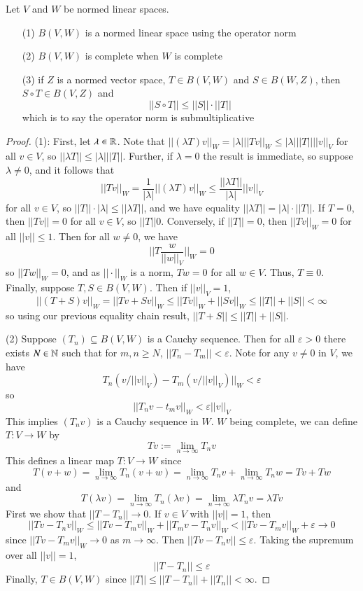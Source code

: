 \begin{proposition}
    Let $V$ and $W$ be normed linear spaces. \begin{itemize}
        \item[(1)] $B(V,W)$ is a normed linear space using the operator norm
        \item[(2)] $B(V,W)$ is complete when $W$ is complete
        \item[(3)] if $Z$ is a normed vector space, $T \in B(V,W)$ and $S \in B(W,Z)$, then $S\circ T \in B(V,Z)$ and $$||S\circ T|| \leq ||S||\cdot||T||$$
            which is to say the operator norm is submultiplicative
    \end{itemize}
\end{proposition}
\begin{proof}
    (1): First, let $\lambda \in \mathbb R$. Note that $||(\lambda T)v||_W = |\lambda|||Tv||_W \leq |\lambda|||T||||v||_V$ for all $v \in V$, so $||\lambda T|| \leq |\lambda|||T||$. Further, if $\lambda = 0$ the result is immediate, so suppose $\lambda \neq 0$, and it follows that $$||Tv||_W = \frac{1}{|\lambda|}||(\lambda T)v||_W \leq \frac{||\lambda T||}{|\lambda|}||v||_V$$ for all $v \in V$, so $|| T||\cdot|\lambda| \leq ||\lambda T||$, and we have equality $||\lambda T|| = |\lambda|\cdot||T||$. If $T = 0$, then $||Tv|| = 0$ for all $v \in V$, so $||T|| 0$. Conversely, if $||T|| = 0$, then $||Tv||_W = 0$ for all $||v|| \leq 1$. Then for all $w \neq 0$, we have $$||T\frac{w}{||w||_V}||_W = 0$$ so $||Tw||_W = 0$, and as $||\cdot||_W$ is a norm, $Tw = 0$ for all $w \in V$. Thus, $T \equiv 0$. Finally, suppose $T,S \in B(V,W)$. Then if $||v||_V = 1$, $$||(T+S)v||_W = ||Tv+Sv||_W \leq ||Tv||_W+||Sv||_W \leq ||T|| + ||S|| < \infty$$ so using our previous equality chain result, $||T+S|| \leq ||T|| + ||S||$.

    (2) Suppose $(T_n) \subseteq B(V,W)$ is a Cauchy sequence. Then for all $\varepsilon > 0$ there exists $N \in \mathbb N$ such that for $m,n \geq N$, $||T_n - T_m || < \varepsilon$. Note for any $v\neq 0$ in $V$, we have $$T_n(v/||v||_V) - T_m(v/||v||_V)||_W < \varepsilon$$ so $$||T_nv - t_mv||_W <\varepsilon||v||_V$$ This implies $(T_nv)$ is a Cauchy sequence in $W$. $W$ being complete, we can define $T:V\rightarrow W$ by $$Tv:= \lim\limits_{n\rightarrow \infty}T_nv$$ This defines a linear map $T:V\rightarrow W$ since $$T(v+w) = \lim\limits_{n\rightarrow\infty}T_n(v+w) = \lim\limits_{n\rightarrow \infty}T_nv + \lim\limits_{n\rightarrow \infty}T_nw = Tv + Tw$$ and $$T(\lambda v) = \lim\limits_{n\rightarrow \infty}T_n(\lambda v) = \lim\limits_{n\rightarrow \infty}\lambda T_nv = \lambda Tv$$ First we show that $||T-T_n||\rightarrow 0$. If $v \in V$ with $||v|| = 1$, then $$||Tv - T_nv||_W \leq ||Tv - T_mv||_W + ||T_mv-T_nv||_W < ||Tv - T_mv||_W+\varepsilon\rightarrow 0$$ since $||Tv-T_mv||_W\rightarrow 0$ as $m\rightarrow \infty$. Then $||Tv-T_nv|| \leq \varepsilon$. Taking the supremum over all $||v|| = 1$, $$||T-T_n||\leq \varepsilon$$ Finally, $T \in B(V,W)$ since $||T|| \leq ||T-T_n|| + ||T_n|| <\infty$.


\end{proof}
